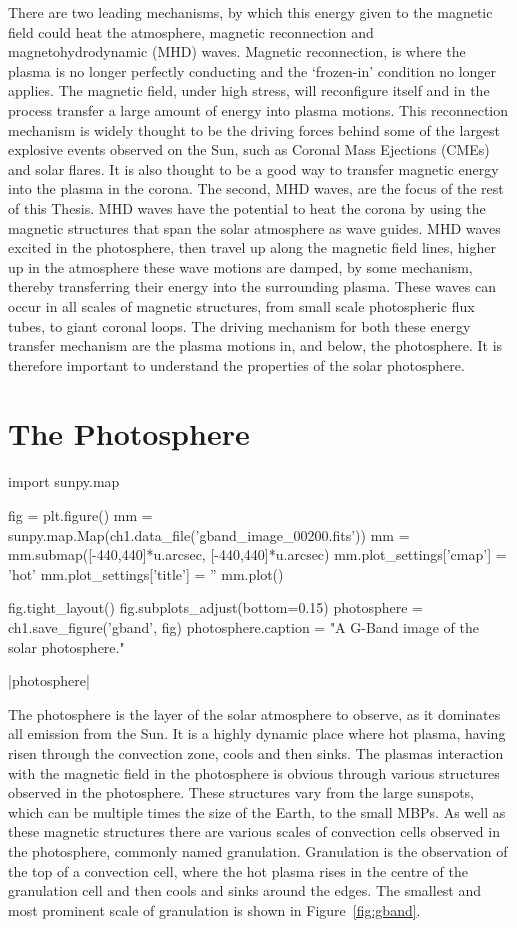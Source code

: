 There are two leading mechanisms, by which this energy given to the magnetic field could heat the atmosphere, magnetic reconnection and magnetohydrodynamic (MHD) waves.
Magnetic reconnection, is where the plasma is no longer perfectly conducting and the `frozen-in' condition no longer applies.
The magnetic field, under high stress, will reconfigure itself and in the process transfer a large amount of energy into plasma motions.
This reconnection mechanism is widely thought to be the driving forces behind some of the largest explosive events observed on the Sun, such as Coronal Mass Ejections (CMEs) and solar flares.
It is also thought to be a good way to transfer magnetic energy into the plasma in the corona.
The second, MHD waves, are the focus of the rest of this Thesis.
MHD waves have the potential to heat the corona by using the magnetic structures that span the solar atmosphere as wave guides.
MHD waves excited in the photosphere, then travel up along the magnetic field lines, higher up in the atmosphere these wave motions are damped, by some mechanism, thereby transferring their energy into the surrounding plasma.
These waves can occur in all scales of magnetic structures, from small scale photospheric flux tubes, to giant coronal loops.
The driving mechanism for both these energy transfer mechanism are the plasma motions in, and below, the photosphere.
It is therefore important to understand the properties of the solar photosphere.

\section{The Photosphere} 

\begin{pycode}[chapter1]
import sunpy.map

fig = plt.figure()
mm = sunpy.map.Map(ch1.data_file('gband_image_00200.fits'))
mm = mm.submap([-440,440]*u.arcsec, [-440,440]*u.arcsec)
mm.plot_settings['cmap'] = 'hot'
mm.plot_settings['title'] = ''
mm.plot()

fig.tight_layout()
fig.subplots_adjust(bottom=0.15)
photosphere = ch1.save_figure('gband', fig)
photosphere.caption = "A G-Band image of the solar photosphere."
\end{pycode}

\py[chapter1]|photosphere|

The photosphere is the layer of the solar atmosphere to observe, as it dominates all emission from the Sun.
It is a highly dynamic place where hot plasma, having risen through the convection zone, cools and then sinks.
The plasmas interaction with the magnetic field in the photosphere is obvious through various structures observed in the photosphere.
These structures vary from the large sunspots, which can be multiple times the size of the Earth, to the small MBPs.
As well as these magnetic structures there are various scales of convection cells observed in the photosphere, commonly named granulation.
Granulation is the observation of the top of a convection cell, where the hot plasma rises in the centre of the granulation cell and then cools and sinks around the edges.
The smallest and most prominent scale of granulation is shown in Figure~\ref{fig:gband}.

